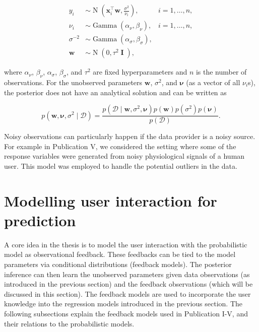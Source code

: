 \documentclass[dissertation,math,vertlayout,pdfa,colorlinks]{aaltoseries}
\newcommand{\bw}{\bm{w}}
\newcommand{\bD}{\mathcal{D}}
\DeclareMathOperator{\eye}{\textbf{I}}
\DeclareMathOperator{\normalpdf}{N}
\DeclareMathOperator{\gammapdf}{Gamma}
\newcommand{\tp}{^{\top}}
\begin{document}
	
\begin{align}\label{Eq:ard_Bayesian_regression}
y_i &\sim \normalpdf(\bm{x}_i\tp\bw,\frac{\sigma^2}{\nu_i}),  & i=1,\ldots,n,\\
\nu_i &\sim \gammapdf(\alpha_{\nu}, \beta_{\nu}), & i=1,\ldots,n,\nonumber \\
\sigma^{-2} &\sim \gammapdf(\alpha_{\sigma}, \beta_{\sigma}), \nonumber \\
\bw &\sim \normalpdf(0,\tau^2 \eye), \nonumber
\end{align}

\noindent where $\alpha_{\nu}$, $\beta_{\nu}$, $\alpha_{\sigma}$, $\beta_{\sigma}$, and $\tau^2$ are fixed hyperparameters and $n$ is the number of observations. For the unobserved parameters $\bw$, $\sigma^2$, and $\bm{\nu}$ (as a vector of all $\nu_i$s), the posterior does not have an analytical solution and can be written as

\begin{equation}\label{Eq:Bayes_rule_ARD}
p(\bw, \bm{\nu}, \sigma^2 \mid \bD) = \frac{p(\bD \mid \bw, \sigma^2, \bm{\nu})p(\bw)p(\sigma^2)p(\bm{\nu})}{p(\bD)}.
\end{equation} 

Noisy observations can particularly happen if the data provider is a noisy source. For example in Publication V, we considered the setting where some of the response variables were generated from noisy physiological signals of a human user. This model was employed to handle the potential outliers in the data. 



\section{Modelling user interaction for prediction}\label{prob_model_user}

A core idea in the thesis is to model the user interaction with the probabilistic model as observational feedback. These feedbacks can be tied to the model parameters via conditional distributions (feedback models). The posterior inference can then learn the unobserved parameters given data observations (as introduced in the previous section) and the feedback observations (which will be discussed in this section). The feedback models are used to incorporate the user knowledge into the regression models introduced in the previous section. The following subsections explain the feedback models used in Publication I-V, and their relations to the probabilistic models.
\end{document}
